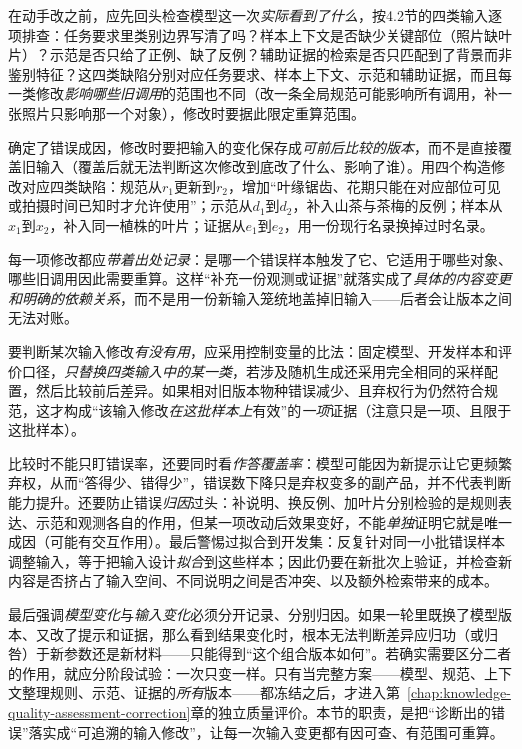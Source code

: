 在动手改之前，应先回头检查模型这一次\emph{实际看到了什么}，按4.2节的四类输入逐项排查：任务要求里类别边界写清了吗？样本上下文是否缺少关键部位（照片缺叶片）？示范是否只给了正例、缺了反例？辅助证据的检索是否只匹配到了背景而非鉴别特征？这四类缺陷分别对应任务要求、样本上下文、示范和辅助证据，而且每一类修改\emph{影响哪些旧调用}的范围也不同（改一条全局规范可能影响所有调用，补一张照片只影响那一个对象），修改时要据此限定重算范围。

确定了错误成因，修改时要把输入的变化保存成\emph{可前后比较的版本}，而不是直接覆盖旧输入（覆盖后就无法判断这次修改到底改了什么、影响了谁）。用四个构造修改对应四类缺陷：规范从$r_1$更新到$r_2$，增加“叶缘锯齿、花期只能在对应部位可见或拍摄时间已知时才允许使用”；示范从$d_1$到$d_2$，补入山茶与茶梅的反例；样本从$x_1$到$x_2$，补入同一植株的叶片；证据从$e_1$到$e_2$，用一份现行名录换掉过时名录。

每一项修改都应\emph{带着出处记录}：是哪一个错误样本触发了它、它适用于哪些对象、哪些旧调用因此需要重算。这样“补充一份观测或证据”就落实成了\emph{具体的内容变更和明确的依赖关系}，而不是用一份新输入笼统地盖掉旧输入——后者会让版本之间无法对账。

要判断某次输入修改\emph{有没有用}，应采用控制变量的比法：固定模型、开发样本和评价口径，\emph{只替换四类输入中的某一类}，若涉及随机生成还采用完全相同的采样配置，然后比较前后差异。如果相对旧版本物种错误减少、且弃权行为仍然符合规范，这才构成“该输入修改\emph{在这批样本上}有效”的\emph{一项}证据（注意只是一项、且限于这批样本）。

比较时不能只盯错误率，还要同时看\emph{作答覆盖率}：模型可能因为新提示让它更频繁弃权，从而“答得少、错得少”，错误数下降只是弃权变多的副产品，并不代表判断能力提升。还要防止错误\emph{归因}过头：补说明、换反例、加叶片分别检验的是规则表达、示范和观测各自的作用，但某一项改动后效果变好，不能\emph{单独}证明它就是唯一成因（可能有交互作用）。最后警惕过拟合到开发集：反复针对同一小批错误样本调整输入，等于把输入设计\emph{拟合}到这些样本；因此仍要在新批次上验证，并检查新内容是否挤占了输入空间、不同说明之间是否冲突、以及额外检索带来的成本。

最后强调\emph{模型变化}与\emph{输入变化}必须分开记录、分别归因。如果一轮里既换了模型版本、又改了提示和证据，那么看到结果变化时，根本无法判断差异应归功（或归咎）于新参数还是新材料——只能得到“这个组合版本如何”。若确实需要区分二者的作用，就应分阶段试验：一次只变一样。只有当完整方案——模型、规范、上下文整理规则、示范、证据的\emph{所有}版本——都冻结之后，才进入第~\ref{chap:knowledge-quality-assessment-correction}章的独立质量评价。本节的职责，是把“诊断出的错误”落实成“可追溯的输入修改”，让每一次输入变更都有因可查、有范围可重算。


